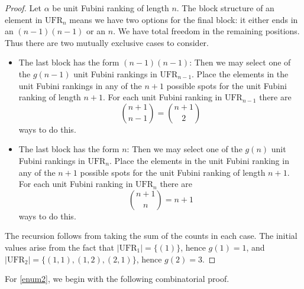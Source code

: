 \documentclass[11pt,reqno]{amsart}
\theoremstyle{definition}
\theoremstyle{notation}
\theoremstyle{openproblem}
\newcommand{\UFR}[1]{\text{UFR}_{#1}}
\begin{document}
\begin{proof}
    Let $\alpha$ be unit Fubini ranking of length $n$. 
    The block structure of an element in $\UFR{n}$ means we have two options for the final block: it either ends in an $(n-1)(n-1)$ or an $n$. We have total freedom in the remaining positions. Thus there are two mutually exclusive cases to  consider.
    \begin{itemize}
        \item The last block has the form  $(n-1)(n-1)$: Then we may select one of the $g(n-1)$ unit Fubini rankings in $\UFR{n-1}$. Place the elements in the unit Fubini rankings in any of the $n+1$ possible spots for the unit Fubini ranking of length $n+1$. For each unit Fubini ranking in $\UFR{n-1}$ there are 
        \[
        \binom{n+1}{n-1} = \binom{n+1}{2}
        \]
        ways to do this.
        \item The last block has the form $n$: Then we may select one of the $g(n)$ unit Fubini rankings in $\UFR{n}$. Place the elements in the unit Fubini ranking in any of the $n+1$ possible spots for the unit Fubini ranking of length $n+1$. For each unit Fubini ranking in $\UFR{n}$ there are \[\binom{n+1}{n} = n+1\] ways to do this.
    \end{itemize}
    The recursion follows from taking the sum of the counts in each case. The initial values arise from the fact that $|\UFR{1}|=\{(1)\}$, hence $g(1)=1$, and $|\UFR{2}|=\{(1,1),(1,2),(2,1)\}$, hence $g(2)=3$.    
\end{proof}

For \eqref{enum2}, we begin with the following combinatorial proof.

\newFormulaThm*
\end{document}
